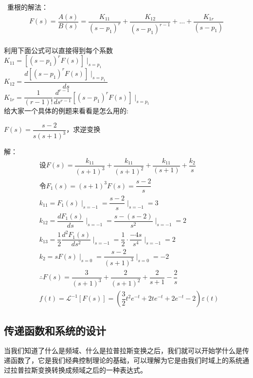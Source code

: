 \documentclass[UTF8,a4paper,12pt]{ctexart}
\begin{document}
\begin{flushleft}
    \begin{notitlebox}
      \ 重根的解法：
      \begin{align*}
        F(s)=\dfrac{A(s)}{B(s)}=\dfrac{K_{11}}{\left( s-p_1 \right) ^r}+\dfrac{K_{12}}{\left( s-p_1 \right) ^{r-1}}+...+\dfrac{K_{1r}}{\left( s-p_1 \right) }
      \end{align*}
      \\利用下面公式可以直接得到每个系数
      \\$K_{11}=[\left( s-p_1 \right) ^r F(s)]\mid_{s=p_1}^{}$
      \vspace{0.5cm}
      \\$K_{12}=\dfrac{d[\left( s-p_1 \right) ^r F(s)]\mid_{s=p_1}^{}}{ds}$
      \vspace{0.5cm}
      \\$K_{1r}=\dfrac{1}{(r-1)!}\dfrac{d^{r-1}}{ds^{r-1}}[\left( s-p_1 \right) ^r F(s)]\mid_{s=p_1}^{}$
      \\给大家一个具体的例题来看看是怎么用的:
      \begin{center}
        $F(s)=\dfrac{s-2}{s(s+1)^3}$，求逆变换  
      \end{center}
      解：
      \begin{align*}
        &\text{设}F(s)=\dfrac{k_{11}}{(s+1)^3}+\dfrac{k_{11}}{(s+1)^2}+\dfrac{k_{11}}{(s+1)}+\dfrac{k_2}{s}\\
        &\text{令}F_1(s)=(s+1)^3F(s)=\dfrac{s-2}{s}\\
        &k_{11}=F_1(s)\mid_{s=-1}{}=\dfrac{s-2}{s}\mid_{s=-1}=3\\
        &k_{12}=\dfrac{dF_1(s)}{ds}\mid_{s=-1}{}=\dfrac{s-(s-2)}{s^2}\mid_{s=-1}=2\\
        &k_{13}=\dfrac{1}{2}\dfrac{d^2F_1(s)}{ds^2}\mid_{s=-1}{}=\dfrac{1}{2}\cdot\dfrac{-4s}{s^4}\mid_{s=-1}=2\\
        &k_{2}=sF(s)\mid_{s=0}{}=\dfrac{s-2}{(s+1)^3}\mid_{s=0}=-2\\
        &\therefore F(s)=\dfrac{3}{(s+1)^3}+\dfrac{2}{(s+1)^2}+\dfrac{2}{s+1}-\dfrac{2}{s}\\
         &f(t)=\mathcal{L}^{-1}[F(s)]=(\dfrac{3}{2}t^2e^{-t}+2te^{-t}+2e^{-t}-2)\varepsilon(t) 
      \end{align*}
      
    \end{notitlebox}
    
  \end{flushleft}

    \subsection{传递函数和系统的设计}
    当我们知道了什么是频域、什么是拉普拉斯变换之后，我们就可以开始学什么是传递函数了，它是我们经典控制理论的基础，可以理解为它是由我们时域上的系统通过拉普拉斯变换转换成频域之后的一种表达式。
\end{document}
